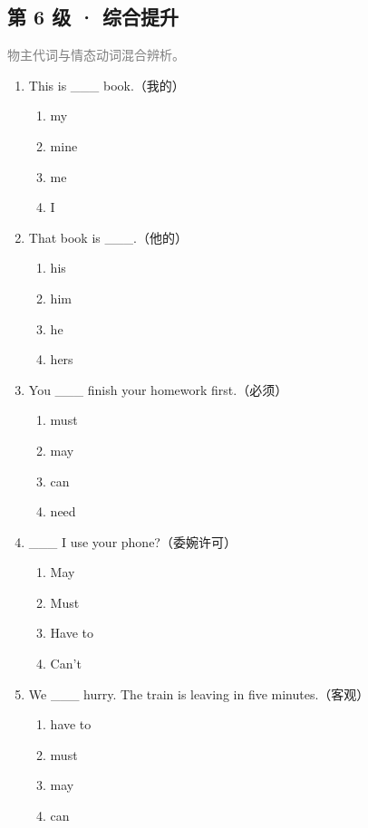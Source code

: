 \documentclass[11pt,a4paper]{ctexart}
\begin{document}
\subsection*{第 6 级 · 综合提升}
\noindent\textcolor{gray}{物主代词与情态动词混合辨析。}\par\smallskip
\begin{enumerate}[leftmargin=*,itemsep=4pt]
\item This is \_\_\_ book.（我的）
\begin{enumerate}[label=\Alph*.,leftmargin=2em,itemsep=1pt,topsep=2pt]
\item my
\item mine
\item me
\item I
\end{enumerate}
\item That book is \_\_\_.（他的）
\begin{enumerate}[label=\Alph*.,leftmargin=2em,itemsep=1pt,topsep=2pt]
\item his
\item him
\item he
\item hers
\end{enumerate}
\item You \_\_\_ finish your homework first.（必须）
\begin{enumerate}[label=\Alph*.,leftmargin=2em,itemsep=1pt,topsep=2pt]
\item must
\item may
\item can
\item need
\end{enumerate}
\item \_\_\_ I use your phone?（委婉许可）
\begin{enumerate}[label=\Alph*.,leftmargin=2em,itemsep=1pt,topsep=2pt]
\item May
\item Must
\item Have to
\item Can’t
\end{enumerate}
\item We \_\_\_ hurry. The train is leaving in five minutes.（客观）
\begin{enumerate}[label=\Alph*.,leftmargin=2em,itemsep=1pt,topsep=2pt]
\item have to
\item must
\item may
\item can

\end{enumerate}
\end{enumerate}
\end{document}
